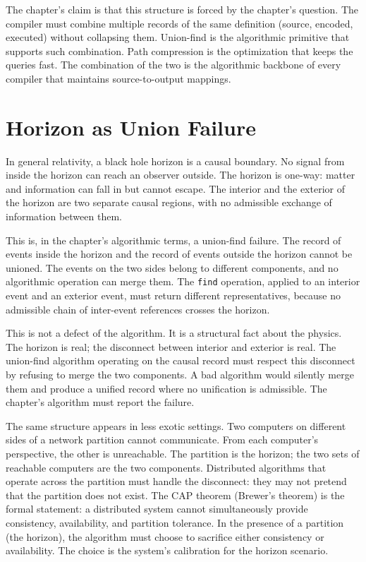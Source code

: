 The chapter's claim is that this structure is forced by the
chapter's question. The compiler must combine multiple records of
the same definition (source, encoded, executed) without collapsing
them. Union-find is the algorithmic primitive that supports such
combination. Path compression is the optimization that keeps the
queries fast. The combination of the two is the algorithmic
backbone of every compiler that maintains source-to-output mappings.

\section{Horizon as Union Failure}
\label{se:horizon-as-union-failure}

In general relativity, a black hole horizon is a causal boundary. No
signal from inside the horizon can reach an observer outside. The
horizon is one-way: matter and information can fall in but cannot escape.
The interior and the exterior of the horizon are two separate causal
regions, with no admissible exchange of information between them.

This is, in the chapter's algorithmic terms, a union-find failure. The
record of events inside the horizon and the record of events outside
the horizon cannot be unioned. The events on the two sides belong to
different components, and no algorithmic operation can merge them. The
\texttt{find} operation, applied to an interior event and an exterior
event, must return different representatives, because no admissible
chain of inter-event references crosses the horizon.

This is not a defect of the algorithm. It is a structural fact about
the physics. The horizon is real; the disconnect between interior and
exterior is real. The union-find algorithm operating on the causal
record must respect this disconnect by refusing to merge the two
components. A bad algorithm would silently merge them and produce a
unified record where no unification is admissible. The chapter's
algorithm must report the failure.

The same structure appears in less exotic settings. Two computers on
different sides of a network partition cannot communicate. From each
computer's perspective, the other is unreachable. The partition is
the horizon; the two sets of reachable computers are the two
components. Distributed algorithms that operate across the partition
must handle the disconnect: they may not pretend that the partition
does not exist. The CAP theorem (Brewer's theorem) is the formal
statement: a distributed system cannot simultaneously provide
consistency, availability, and partition tolerance. In the presence
of a partition (the horizon), the algorithm must choose to sacrifice
either consistency or availability. The choice is the system's
calibration for the horizon scenario.

